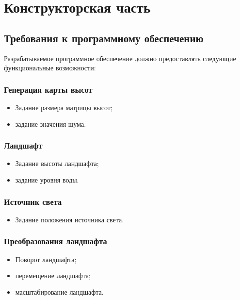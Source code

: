 \chapter{Конструкторская часть}

\section{Требования к программному обеспечению}

Разрабатываемое программное обеспечение должно предоставлять следующие функциональные возможности:

\subsection*{Генерация карты высот}

\begin{itemize}
	\item Задание размера матрицы высот;
	\item задание значения шума.
\end{itemize}

\subsection*{Ландшафт}

\begin{itemize}
	\item Задание высоты ландшафта;
	\item задание уровня воды.
\end{itemize}

\subsection*{Источник света}

\begin{itemize}
	\item Задание положения источника света.
\end{itemize}

\subsection*{Преобразования ландшафта}

\begin{itemize}
	\item Поворот ландшафта;
	\item перемещение ландшафта;
	\item масштабирование ландшафта.
\end{itemize}

